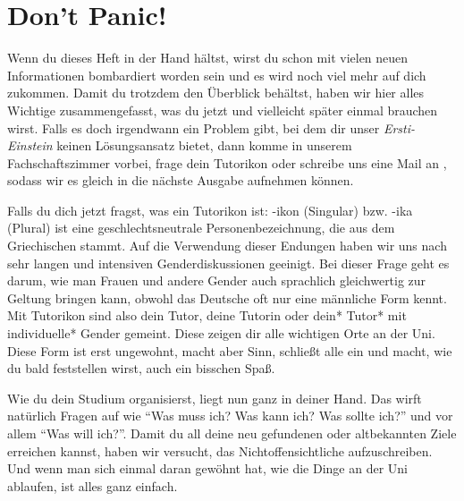 %
%

\chapter{Don't Panic!}

Wenn du dieses Heft in der Hand hältst, wirst du schon mit vielen neuen Informationen bombardiert worden sein und es wird noch viel mehr auf dich zukommen. Damit du trotzdem den Überblick behältst, haben wir hier alles Wichtige zusammengefasst, was du jetzt und vielleicht später einmal brauchen wirst. Falls es doch irgendwann ein Problem gibt, bei dem dir unser \emph{Ersti-Einstein} keinen Lösungsansatz bietet, dann komme in unserem Fachschaftszimmer vorbei, frage dein Tutorikon oder schreibe uns eine Mail an , sodass wir es gleich in die nächste Ausgabe aufnehmen können. 

Falls du dich jetzt fragst, was ein Tutorikon ist: -ikon (Singular) bzw. -ika (Plural) ist eine geschlechtsneutrale Personenbezeichnung, die aus dem Griechischen stammt. Auf die Verwendung dieser Endungen haben wir uns nach sehr langen und intensiven Genderdiskussionen geeinigt. Bei dieser Frage geht es darum, wie man Frauen und andere Gender auch sprachlich gleichwertig zur Geltung bringen kann, obwohl das Deutsche oft nur eine männliche Form kennt. Mit Tutorikon sind also dein Tutor, deine Tutorin oder dein* Tutor* mit individuelle* Gender gemeint. Diese zeigen dir alle wichtigen Orte an der Uni. Diese Form ist erst ungewohnt, macht aber Sinn, schließt alle ein und macht, wie du bald feststellen wirst, auch ein bisschen Spaß.

Wie du dein Studium organisierst, liegt nun ganz in deiner Hand. Das wirft natürlich Fragen auf wie \enquote{Was muss ich? Was kann ich? Was sollte ich?} und vor allem \enquote{Was will ich?}. Damit du all deine neu gefundenen oder altbekannten Ziele erreichen kannst, haben wir versucht, das Nichtoffensichtliche aufzuschreiben. Und wenn man sich einmal daran gewöhnt hat, wie die Dinge an der Uni ablaufen, ist alles ganz einfach.

